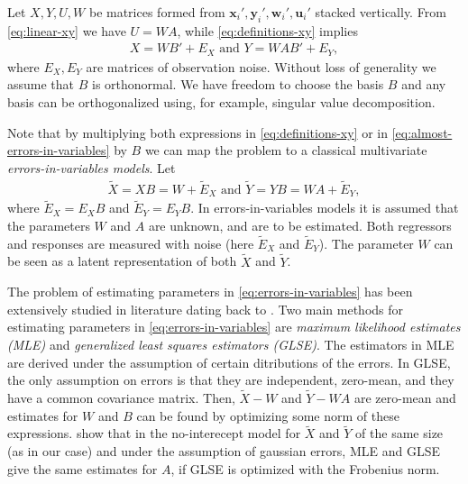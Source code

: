 \documentclass[preprint]{imsart}
\numberwithin{equation}{section}
\theoremstyle{plain}
\newcommand{\by}{\mathbf{y}}
\newcommand{\bx}{\mathbf{x}}
\newcommand{\bw}{\mathbf{w}}
\newcommand{\bu}{\mathbf{u}}
\DeclareMathOperator*{\rank}{rank}
\begin{document}
Let $X,Y,U,W$ be matrices formed from $\bx_i',\by_i',\bw_i',\bu_i'$ stacked vertically. From \eqref{eq:linear-xy} we have $U = WA$, while \eqref{eq:definitions-xy} implies
\begin{align}\label{eq:almost-errors-in-variables}
X = WB' + E_X \text{ \ and \ } Y = WA B' + E_{Y},
\end{align}
where $E_X,E_Y$ are matrices of observation noise. Without loss of generality we assume that $B$ is orthonormal. We have freedom to choose the basis $B$ and any basis can be orthogonalized using, for example, singular value decomposition. 

Note that by multiplying both expressions in \eqref{eq:definitions-xy} or in \eqref{eq:almost-errors-in-variables} by $B$ we can map the problem to a classical multivariate {\em errors-in-variables models}. Let
\begin{align}\label{eq:errors-in-variables}
  \tilde{X} = XB = W + \tilde{E}_X \text{ and } \tilde{Y} = YB = WA + \tilde{E}_Y,
\end{align}  
where $\tilde{E}_X = E_XB$ and $\tilde{E}_Y = E_YB$. In errors-in-variables models it is assumed that the parameters $W$ and $A$ are unknown, and are to be estimated. Both regressors and responses are measured with noise (here $\tilde{E}_X$ and $\tilde{E}_Y$). The parameter $W$ can be seen as a latent representation of both $\tilde{X}$ and $\tilde{Y}$.

The problem of estimating parameters in \eqref{eq:errors-in-variables} has been extensively studied in literature dating back to \citet{adcock1878problem}. Two main methods for estimating parameters in \eqref{eq:errors-in-variables} are {\em maximum likelihood estimates (MLE)} and {\em generalized least squares estimators (GLSE)}. The estimators in MLE are derived under the assumption of certain ditributions of the errors. In GLSE, the only assumption on errors is that they are independent, zero-mean, and they have a common covariance matrix. Then, $\tilde{X} - W$ and $\tilde{Y} - WA$ are zero-mean and estimates for $W$ and $B$ can be found by optimizing some norm of these expressions. \citet{gleser1973estimation} show that in the no-interecept model for $\tilde{X}$ and $\tilde{Y}$ of the same size (as in our case) and under the assumption of gaussian errors, MLE and GLSE give the same estimates for $A$, if GLSE is optimized with the Frobenius norm.

\end{document}
